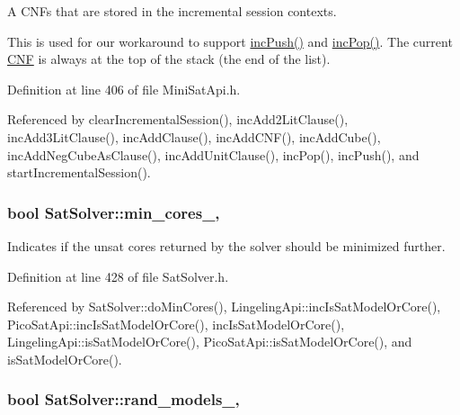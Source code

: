 A C\-N\-Fs that are stored in the incremental session contexts. 

This is used for our workaround to support \hyperlink{classMiniSatApi_a27013ace25320f68252bef5ba9f2e9ad}{inc\-Push()} and \hyperlink{classMiniSatApi_af388f97db15f77baeb420a8fef74ca6a}{inc\-Pop()}. The current \hyperlink{classCNF}{C\-N\-F} is always at the top of the stack (the end of the list). 

Definition at line 406 of file Mini\-Sat\-Api.\-h.



Referenced by clear\-Incremental\-Session(), inc\-Add2\-Lit\-Clause(), inc\-Add3\-Lit\-Clause(), inc\-Add\-Clause(), inc\-Add\-C\-N\-F(), inc\-Add\-Cube(), inc\-Add\-Neg\-Cube\-As\-Clause(), inc\-Add\-Unit\-Clause(), inc\-Pop(), inc\-Push(), and start\-Incremental\-Session().

\hypertarget{classSatSolver_adfeecebfd09606c82b5c57cfe5aad813}{
\subsubsection[{min\-\_\-cores\-\_\-}]{\setlength{\rightskip}{0pt plus 5cm}bool Sat\-Solver\-::min\-\_\-cores\-\_\-\hspace{0.3cm}{\ttfamily [protected]}, {\ttfamily [inherited]}}}\label{classSatSolver_adfeecebfd09606c82b5c57cfe5aad813}


Indicates if the unsat cores returned by the solver should be minimized further. 



Definition at line 428 of file Sat\-Solver.\-h.



Referenced by Sat\-Solver\-::do\-Min\-Cores(), Lingeling\-Api\-::inc\-Is\-Sat\-Model\-Or\-Core(), Pico\-Sat\-Api\-::inc\-Is\-Sat\-Model\-Or\-Core(), inc\-Is\-Sat\-Model\-Or\-Core(), Lingeling\-Api\-::is\-Sat\-Model\-Or\-Core(), Pico\-Sat\-Api\-::is\-Sat\-Model\-Or\-Core(), and is\-Sat\-Model\-Or\-Core().

\hypertarget{classSatSolver_a73fed24d8fb4da85ef82dc53ac5f28c7}{
\subsubsection[{rand\-\_\-models\-\_\-}]{\setlength{\rightskip}{0pt plus 5cm}bool Sat\-Solver\-::rand\-\_\-models\-\_\-\hspace{0.3cm}{\ttfamily [protected]}, {\ttfamily [inherited]}}}\label{classSatSolver_a73fed24d8fb4da85ef82dc53ac5f28c7}


